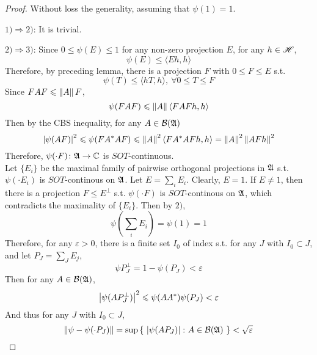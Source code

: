 \begin{proof}
	Without loss the generality, assuming that $\psi(1) = 1$.
	\item $1) \Rightarrow 2)$: It is trivial.
	\item $2) \Rightarrow 3)$: Since $0 \leqslant \psi(E) \leqslant 1$ for any non-zero projection $E$, for any $h \in \mathscr{H}$,
	\begin{equation*}
		\psi(E) \leqslant \langle Eh,h \rangle
	\end{equation*}
	Therefore, by preceding lemma, there is a projection $F$ with $0 \leqslant F \leqslant E$ s.t.
	\begin{equation*}
		\psi(T) \leqslant \langle hT,h \rangle,~ \forall 0 \leqslant  T \leqslant F
	\end{equation*}
	Since $FAF \leqslant \left\lVert A\right\lVert F$, 
	\begin{equation*}
		\psi(FAF) \leqslant \left\lVert A\right\lVert \langle FAFh,h \rangle
	\end{equation*}
	Then by the CBS inequality, for any $A \in \mathcal{B}(\mathfrak{A})$
	\begin{equation*}
		\left\lvert\psi(AF)\right\lvert^2 \leqslant \psi(FA^{*}AF) \leqslant \left\lVert A\right\lVert^2 \langle FA^{*}AFh,h \rangle = \left\lVert A\right\lVert^2 \left\lVert AFh\right\lVert^2
	\end{equation*}
	Therefore, $\psi(\cdot F) \colon \mathfrak{A} \rightarrow \mathbb{C}$ is $SOT$-continuous. \\
	Let $\{E_i\}$ be the maximal family of pairwise orthogonal projections in $\mathfrak{A}$ s.t. $\psi(\cdot E_i)$ is $SOT$-continous on $\mathfrak{A}$. Let $E = \sum_i E_i$. Clearly, $E = 1$. If $E \neq 1$, then there is a projection $F \leqslant E^{\bot}$ s.t. $\psi(\cdot F)$ is $SOT$-continous on $\mathfrak{A}$, which contradicts the maximality of $\{E_i\}$. Then by $2)$,
	\begin{equation*}
		\psi(\sum_i E_i) = \psi(1) = 1
	\end{equation*}  
	Therefore, for any $\varepsilon > 0$, there is a finite set $I_0$ of index s.t. for any $J$ with $I_0 \subset J$, and let $P_J = \sum_J E_j$,
	\begin{equation*}
		\psi{P_J^{\bot}} = 1- \psi(P_J) < \varepsilon
	\end{equation*}
	Then for any $A \in \mathcal{B}(\mathfrak{A})$, 
	\begin{equation*}
		\left\lvert\psi(AP_J^{\bot})\right\lvert^2  \leqslant \psi(AA^{*})\psi(P_J) < \varepsilon
	\end{equation*}
	And thus for any $J$ with $I_0 \subset J$,
	\begin{equation*}
		\norm{\psi - \psi(\cdot P_J)} = \sup{\{~\abs{\psi(AP_J)} \colon A \in \mathcal{B}(\A)~\}} < \sqrt{\varepsilon}

\end{equation*}
\end{proof}

